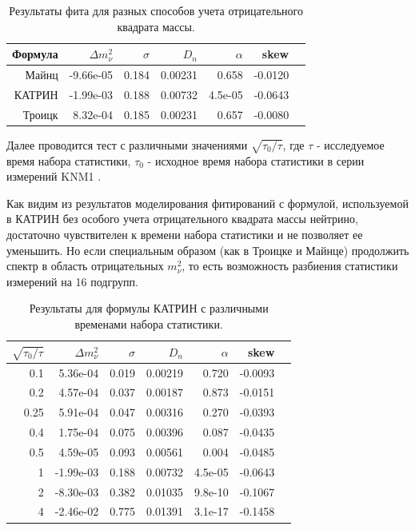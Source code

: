 \documentclass[a4paper,14pt]{extarticle}
\begin{document}
    \begin{table}[h!]
      \caption{Результаты фита для разных способов учета отрицательного квадрата массы.}
	    \begin{center}
		    \begin{tabular}{|r|r|r|r|r|r|r|}
			    \hline
			    Формула & $\Delta m^2_\nu$ & $\sigma$ & $D_n$ & $\alpha$ & skew \\
			    \hline
			    Майнц & -9.66e-05 & 0.184 & 0.00231 & 0.658 & -0.0120 \\
			    \hline
			    КАТРИН & -1.99e-03 & 0.188 & 0.00732 & 4.5e-05 & -0.0643 \\
			    \hline
			    Троицк & 8.32e-04 & 0.185 & 0.00231 & 0.657 & -0.0080 \\
			    \hline
		    \end{tabular}
	    \end{center}
    \end{table}
    
    \newpage
    Далее проводится тест с различными значениями $\sqrt{\tau_0/\tau}$, где
    $\tau$ - исследуемое время набора статистики,
    $\tau_0$ - исходное время набора статистики в серии измерений KNM1 \cite{improved_limit}.
    
    Как видим из результатов моделирования фитирований с формулой, используемой в КАТРИН без особого учета 
    отрицательного квадрата массы нейтрино, достаточно чувствителен к времени набора статистики и не позволяет
    ее уменьшить. Но если специальным образом (как в Троицке и Майнце) продолжить спектр в область отрицательных
    $m^2_\nu$, то есть возможность разбиения статистики измерений на 16 подгрупп.
      
	  \begin{table}[h!]
	    \caption{Результаты для формулы КАТРИН с различными временами набора статистики.}
	    \begin{center}
		    \begin{tabular}{|r|r|r|r|r|r|r|}
			    \hline
			    $\sqrt{\tau_0/\tau}$ & $\Delta m^2_\nu$ & $\sigma$ & $D_n$ & $\alpha$ & skew \\
			    \hline
			    0.1 & 5.36e-04 & 0.019 & 0.00219 & 0.720 & -0.0093 \\
			    \hline
			    0.2 & 4.57e-04 & 0.037 & 0.00187 & 0.873 & -0.0151 \\
			    \hline
			    0.25 & 5.91e-04 & 0.047 & 0.00316 & 0.270 & -0.0393 \\
			    \hline
			    0.4 & 1.75e-04 & 0.075 & 0.00396 & 0.087 & -0.0435 \\
			    \hline
			    0.5 & 4.59e-05 & 0.093 & 0.00561 & 0.004 & -0.0485 \\
			    \hline
			    1 & -1.99e-03 & 0.188 & 0.00732 & 4.5e-05 & -0.0643 \\
			    \hline
			    2 & -8.30e-03 & 0.382 & 0.01035 & 9.8e-10 & -0.1067 \\
			    \hline
			    4 & -2.46e-02 & 0.775 & 0.01391 & 3.1e-17 & -0.1458 \\
			    \hline
		    \end{tabular}
	    \end{center}
    \end{table}
    
\end{document}
